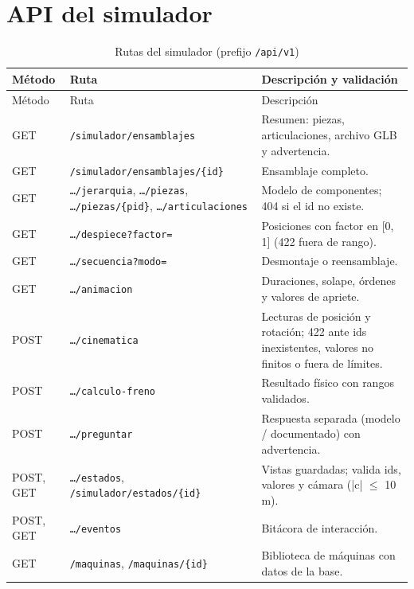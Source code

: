 \section{API del simulador}
\begin{longtable}{@{}P{1.4cm}P{6.4cm}P{7.2cm}@{}}
\caption{Rutas del simulador (prefijo \texttt{/api/v1})}\label{tab:sim-api}\\\toprule
Método & Ruta & Descripción y validación\\\midrule\endfirsthead
\toprule Método & Ruta & Descripción\\\midrule\endhead
GET & \texttt{/simulador/ensamblajes} & Resumen: piezas, articulaciones, archivo GLB y advertencia.\\
GET & \texttt{/simulador/ensamblajes/\{id\}} & Ensamblaje completo.\\
GET & \texttt{\dots/jerarquia}, \texttt{\dots/piezas}, \texttt{\dots/piezas/\{pid\}}, \texttt{\dots/articulaciones} & Modelo de componentes; 404 si el id no existe.\\
GET & \texttt{\dots/despiece?factor=} & Posiciones con factor en [0, 1] (422 fuera de rango).\\
GET & \texttt{\dots/secuencia?modo=} & Desmontaje o reensamblaje.\\
GET & \texttt{\dots/animacion} & Duraciones, solape, órdenes y valores de apriete.\\
POST & \texttt{\dots/cinematica} & Lecturas de posición y rotación; 422 ante ids inexistentes, valores no finitos o fuera de límites.\\
POST & \texttt{\dots/calculo-freno} & Resultado físico con rangos validados.\\
POST & \texttt{\dots/preguntar} & Respuesta separada (modelo / documentado) con advertencia.\\
POST, GET & \texttt{\dots/estados}, \texttt{/simulador/estados/\{id\}} & Vistas guardadas; valida ids, valores y cámara (|c| $\le$ 10\,m).\\
POST, GET & \texttt{\dots/eventos} & Bitácora de interacción.\\
GET & \texttt{/maquinas}, \texttt{/maquinas/\{id\}} & Biblioteca de máquinas con datos de la base.\\\bottomrule
\end{longtable}

